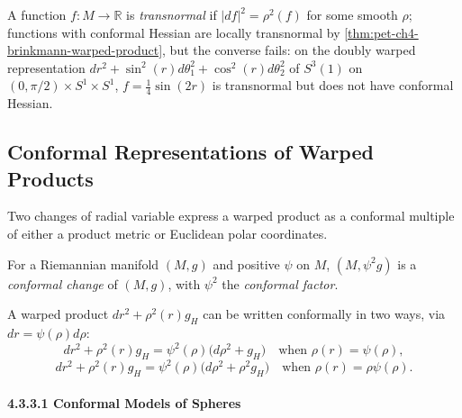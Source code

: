 \begin{remark}
  \label{rem:pet-ch4-transnormal-functions}
  A function $f:M\to\mathbb{R}$ is \emph{transnormal} if $|df|^2=\rho^2(f)$ for some
  smooth $\rho$; functions with conformal Hessian are locally transnormal by
  \cref{thm:pet-ch4-brinkmann-warped-product}, but the converse fails: on the
  doubly warped representation $dr^2+\sin^2(r)d\theta_1^2+\cos^2(r)d\theta_2^2$
  of $S^3(1)$ on $(0,\pi/2)\times S^1\times S^1$, $f=\tfrac14\sin(2r)$ is
  transnormal but does not have conformal Hessian.
\end{remark}

\subsection{Conformal Representations of Warped Products}

Two changes of radial variable express a warped product as a conformal multiple of
either a product metric or Euclidean polar coordinates.

\begin{definition}
  \label{def:pet-ch4-conformal-change}
  \leanok
  For a Riemannian manifold $(M,g)$ and positive $\psi$ on $M$, $(M,\psi^2g)$ is
  a \emph{conformal change} of $(M,g)$, with $\psi^2$ the \emph{conformal
  factor}.
\end{definition}

\begin{definition}
  \label{def:pet-ch4-warped-product-conformal-forms}
  A warped product $dr^2+\rho^2(r)g_H$ can be written conformally in two ways,
  via $dr=\psi(\rho)d\rho$:
  \[
    dr^2+\rho^2(r)g_H=\psi^2(\rho)\big(d\rho^2+g_H\big)\quad\text{when }\rho(r)=\psi(\rho),
  \]
  \[
    dr^2+\rho^2(r)g_H=\psi^2(\rho)\big(d\rho^2+\rho^2g_H\big)\quad\text{when }\rho(r)=\rho\psi(\rho).
  \]
\end{definition}

\paragraph{4.3.3.1 Conformal Models of Spheres}

